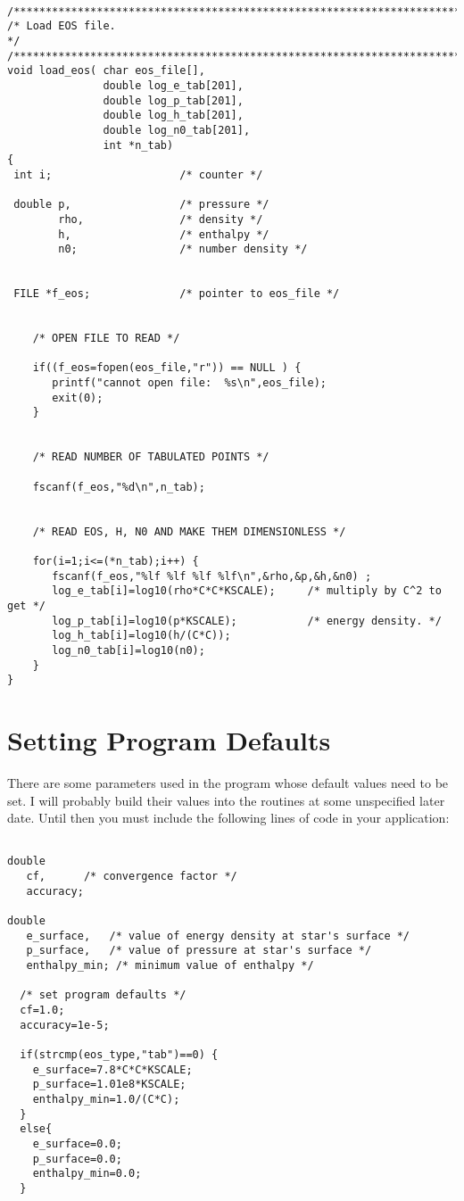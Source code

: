 \begin{verbatim}

/*************************************************************************/
/* Load EOS file.                                                        */ 
/*************************************************************************/
void load_eos( char eos_file[], 
               double log_e_tab[201], 
               double log_p_tab[201], 
               double log_h_tab[201],
               double log_n0_tab[201], 
               int *n_tab)
{
 int i;                    /* counter */

 double p,                 /* pressure */
        rho,               /* density */
        h,                 /* enthalpy */
        n0;                /* number density */    


 FILE *f_eos;              /* pointer to eos_file */
  

    /* OPEN FILE TO READ */

    if((f_eos=fopen(eos_file,"r")) == NULL ) {    
       printf("cannot open file:  %s\n",eos_file); 
       exit(0);
    }

 
    /* READ NUMBER OF TABULATED POINTS */

    fscanf(f_eos,"%d\n",n_tab);


    /* READ EOS, H, N0 AND MAKE THEM DIMENSIONLESS */
 
    for(i=1;i<=(*n_tab);i++) {  
       fscanf(f_eos,"%lf %lf %lf %lf\n",&rho,&p,&h,&n0) ;
       log_e_tab[i]=log10(rho*C*C*KSCALE);     /* multiply by C^2 to get */ 
       log_p_tab[i]=log10(p*KSCALE);           /* energy density. */
       log_h_tab[i]=log10(h/(C*C));        
       log_n0_tab[i]=log10(n0);
    }
}

\end{verbatim}

\section{Setting Program Defaults}

There are some parameters used in the program whose default values 
need to be set. I will probably build their values into the routines
at some unspecified later date. Until then you must include the 
following lines of code in your application:

\begin{verbatim}

double
   cf, 		/* convergence factor */
   accuracy;

double 
   e_surface,  	/* value of energy density at star's surface */
   p_surface,   /* value of pressure at star's surface */
   enthalpy_min; /* minimum value of enthalpy */

  /* set program defaults */
  cf=1.0;
  accuracy=1e-5;    
 
  if(strcmp(eos_type,"tab")==0) {
    e_surface=7.8*C*C*KSCALE;
    p_surface=1.01e8*KSCALE;
    enthalpy_min=1.0/(C*C);
  }
  else{
    e_surface=0.0;
    p_surface=0.0;
    enthalpy_min=0.0;
  }

\end{verbatim}

